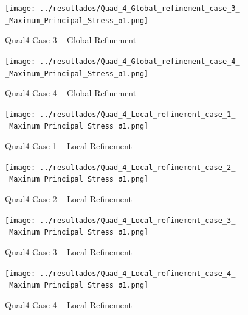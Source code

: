 \documentclass[12pt]{article}
\begin{document}
\begin{figure}[H]
    \centering
    \begin{minipage}{0.48\textwidth}
        \centering
        \texttt{[image: ../resultados/Quad\_4\_Global\_refinement\_case\_3\_-\_Maximum\_Principal\_Stress\_σ1.png]}
        \caption{Quad4 Case 3 – Global Refinement}
        \label{fig:quad4_results_global3}
    \end{minipage}
    \hfill
    \begin{minipage}{0.48\textwidth}
        \centering
        \texttt{[image: ../resultados/Quad\_4\_Global\_refinement\_case\_4\_-\_Maximum\_Principal\_Stress\_σ1.png]}
        \caption{Quad4 Case 4 – Global Refinement}
        \label{fig:quad4_results_global4}
    \end{minipage}
\end{figure}

\begin{figure}[H]
    \centering
    \begin{minipage}{0.48\textwidth}
        \centering
        \texttt{[image: ../resultados/Quad\_4\_Local\_refinement\_case\_1\_-\_Maximum\_Principal\_Stress\_σ1.png]}
        \caption{Quad4 Case 1 – Local Refinement}
        \label{fig:quad4_results_local1}
    \end{minipage}
    \hfill
    \begin{minipage}{0.48\textwidth}
        \centering
        \texttt{[image: ../resultados/Quad\_4\_Local\_refinement\_case\_2\_-\_Maximum\_Principal\_Stress\_σ1.png]}
        \caption{Quad4 Case 2 – Local Refinement}
        \label{fig:quad4_results_local2}
    \end{minipage}
\end{figure}

\begin{figure}[H]
    \centering
    \begin{minipage}{0.48\textwidth}
        \centering
        \texttt{[image: ../resultados/Quad\_4\_Local\_refinement\_case\_3\_-\_Maximum\_Principal\_Stress\_σ1.png]}
        \caption{Quad4 Case 3 – Local Refinement}
        \label{fig:quad4_results_local3}
    \end{minipage}
    \hfill
    \begin{minipage}{0.48\textwidth}
        \centering
        \texttt{[image: ../resultados/Quad\_4\_Local\_refinement\_case\_4\_-\_Maximum\_Principal\_Stress\_σ1.png]}
        \caption{Quad4 Case 4 – Local Refinement}
        \label{fig:quad4_results_local4}
    \end{minipage}
\end{figure}
\end{document}
